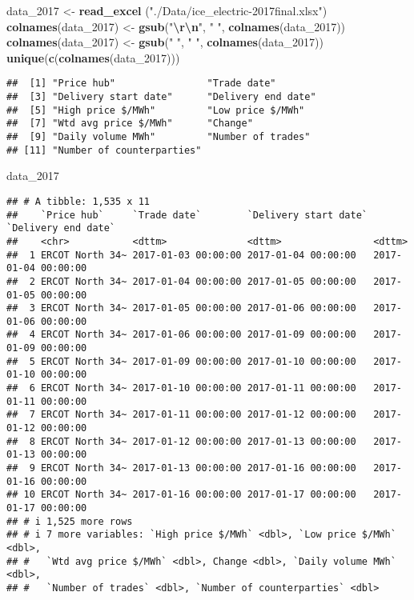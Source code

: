 \documentclass[
]{article}
\newenvironment{Shaded}{\begin{snugshade}}{\end{snugshade}}
\newcommand{\FunctionTok}[1]{\textcolor[rgb]{0.13,0.29,0.53}{\textbf{#1}}}
\newcommand{\NormalTok}[1]{#1}
\newcommand{\OtherTok}[1]{\textcolor[rgb]{0.56,0.35,0.01}{#1}}
\newcommand{\SpecialCharTok}[1]{\textcolor[rgb]{0.81,0.36,0.00}{\textbf{#1}}}
\newcommand{\StringTok}[1]{\textcolor[rgb]{0.31,0.60,0.02}{#1}}
\begin{document}
\begin{Shaded}
\begin{Highlighting}[]
\NormalTok{data\_2017 }\OtherTok{\textless{}{-}} \FunctionTok{read\_excel}\NormalTok{ (}\StringTok{"./Data/ice\_electric{-}2017final.xlsx"}\NormalTok{)}
\FunctionTok{colnames}\NormalTok{(data\_2017) }\OtherTok{\textless{}{-}} \FunctionTok{gsub}\NormalTok{(}\StringTok{"}\SpecialCharTok{\textbackslash{}r\textbackslash{}n}\StringTok{"}\NormalTok{, }\StringTok{" "}\NormalTok{, }\FunctionTok{colnames}\NormalTok{(data\_2017))}
\FunctionTok{colnames}\NormalTok{(data\_2017) }\OtherTok{\textless{}{-}} \FunctionTok{gsub}\NormalTok{(}\StringTok{"  "}\NormalTok{, }\StringTok{" "}\NormalTok{, }\FunctionTok{colnames}\NormalTok{(data\_2017))}
\FunctionTok{unique}\NormalTok{(}\FunctionTok{c}\NormalTok{(}\FunctionTok{colnames}\NormalTok{(data\_2017)))}
\end{Highlighting}
\end{Shaded}

\begin{verbatim}
##  [1] "Price hub"                "Trade date"              
##  [3] "Delivery start date"      "Delivery end date"       
##  [5] "High price $/MWh"         "Low price $/MWh"         
##  [7] "Wtd avg price $/MWh"      "Change"                  
##  [9] "Daily volume MWh"         "Number of trades"        
## [11] "Number of counterparties"
\end{verbatim}

\begin{Shaded}
\begin{Highlighting}[]
\NormalTok{data\_2017}
\end{Highlighting}
\end{Shaded}

\begin{verbatim}
## # A tibble: 1,535 x 11
##    `Price hub`     `Trade date`        `Delivery start date` `Delivery end date`
##    <chr>           <dttm>              <dttm>                <dttm>             
##  1 ERCOT North 34~ 2017-01-03 00:00:00 2017-01-04 00:00:00   2017-01-04 00:00:00
##  2 ERCOT North 34~ 2017-01-04 00:00:00 2017-01-05 00:00:00   2017-01-05 00:00:00
##  3 ERCOT North 34~ 2017-01-05 00:00:00 2017-01-06 00:00:00   2017-01-06 00:00:00
##  4 ERCOT North 34~ 2017-01-06 00:00:00 2017-01-09 00:00:00   2017-01-09 00:00:00
##  5 ERCOT North 34~ 2017-01-09 00:00:00 2017-01-10 00:00:00   2017-01-10 00:00:00
##  6 ERCOT North 34~ 2017-01-10 00:00:00 2017-01-11 00:00:00   2017-01-11 00:00:00
##  7 ERCOT North 34~ 2017-01-11 00:00:00 2017-01-12 00:00:00   2017-01-12 00:00:00
##  8 ERCOT North 34~ 2017-01-12 00:00:00 2017-01-13 00:00:00   2017-01-13 00:00:00
##  9 ERCOT North 34~ 2017-01-13 00:00:00 2017-01-16 00:00:00   2017-01-16 00:00:00
## 10 ERCOT North 34~ 2017-01-16 00:00:00 2017-01-17 00:00:00   2017-01-17 00:00:00
## # i 1,525 more rows
## # i 7 more variables: `High price $/MWh` <dbl>, `Low price $/MWh` <dbl>,
## #   `Wtd avg price $/MWh` <dbl>, Change <dbl>, `Daily volume MWh` <dbl>,
## #   `Number of trades` <dbl>, `Number of counterparties` <dbl>
\end{verbatim}
\end{document}
